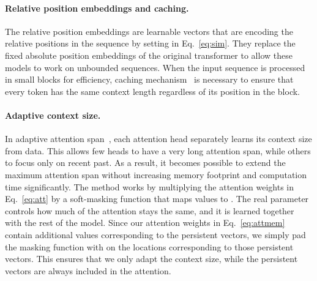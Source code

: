 \documentclass{article}
\newcommand{\eq}[1]{Eq.~\ref{eq:#1}}
\begin{document}
\paragraph{Relative position embeddings and caching.}
The relative position embeddings are learnable vectors  that are encoding the relative positions in the sequence by setting  in \eq{sim}.
They replace the fixed absolute position embeddings of the original transformer to allow these models to work on unbounded sequences. When the input sequence is processed in small blocks for efficiency, caching mechanism~\cite{dai2019transformer} is necessary to ensure that every token  has the same context length regardless of its position in the block.

\paragraph{Adaptive context size.}
In adaptive attention span~\citep{sukhbaatar2019adaptive}, each attention head separately learns its context size from data. This allows few heads to have a very long attention span, while others to focus only on recent past. As a result, it becomes possible to extend the maximum attention span without increasing memory footprint and computation time significantly.
The method works by multiplying the attention weights in \eq{att} by a soft-masking function  that maps values to . The real parameter  controls how much of the attention stays the same, and it is learned together with the rest of the model.
Since our attention weights in \eq{attmem} contain additional values corresponding to the persistent vectors, we simply pad the masking function with  on the locations corresponding to those persistent vectors. This ensures that we only adapt the context size, while the persistent vectors are always included in the attention.
\end{document}
